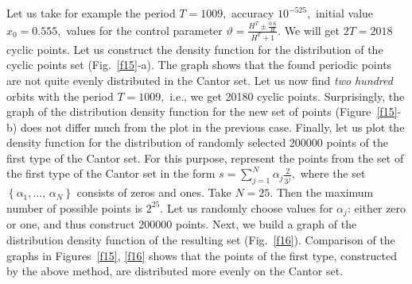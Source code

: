 \documentclass[12pt,a4paper]{amsart}
\begin{document}
Let us take for example the period $T=1009,$ accuracy $10^{-525},$ initial value $x_0=0.555,$ values for the control parameter 
$\vartheta = \frac{H^T \pm \frac{0.6}{H}}{H^T + 1}.$ We will get $2T=2018$ cyclic points. Let us construct the density function for the distribution 
of the cyclic points set (Fig.~\ref{f15}-a). The graph shows that the found periodic points are not quite evenly distributed in the Cantor set. Let us now find \textit{two hundred} orbits with the period 
$T=1009,$ i.e., we get 20180 cyclic points. Surprisingly, the graph of the distribution density function for the new set of points (Figure~\ref{f15}-b) does not differ much 
from the plot in the previous case. Finally, let us plot the density function for the distribution of randomly selected 200000 points of the first type of the Cantor set.
For this purpose, represent the points from the set of the first type of the Cantor set in the form $s = \sum\limits_{j=1}^{N}{\alpha_j}{\frac{2}{3^j}},$ where 
the set $\left\{ \alpha_1,\ldots,\,\alpha_N\right\}$ consists of zeros and ones. Take $N=25.$ Then the maximum number of possible points is $2^{25}$. 
Let us randomly choose values for $\alpha_j$: either zero or one, and thus construct 200000 points. Next, we build a graph of the distribution density function 
of the resulting set (Fig.~\ref{f16}). Comparison of the graphs in Figures~\ref{f15}, \ref{f16} shows that the points of the first type, constructed by the above method, 
are distributed more evenly on the Cantor set. 
 
\end{document}
